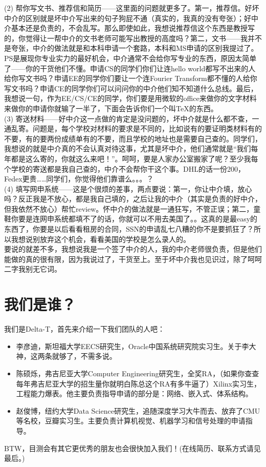 \documentclass{article}
\begin{document}
(2) 帮你写文书、推荐信和简历——这里面的问题就更多了。第一，推荐信。好坏中介的区别就是坏中介写出来的句子狗屁不通（真实的，我真的没有夸张）；好中介基本还是负责的，不会乱写。那么即使如此，我想说推荐信这个东西是教授写的，你觉得让一帮中介的文书老师可能写出教授的高度吗？第二，文书——我并不是夸张，中介的做法就是和本科申请一个套路，本科和MS申请的区别我提过了。PS是展现你专业实力的最好机会，中介通常不会给你写专业的东西，原因太简单了——你的干货他们不懂。申请CS的同学们你们让连hello world都写不出来的人给你写文书吗？申请EE的同学你们要让一个连Fourier Transform都不懂的人给你写文书吗？申请CE的同学你们可以问问你的中介他们知不知道什么总线。最后，我想说一句，作为EE/CS/CE的同学，你们要是用微软的office来做你的文字材料来做你的申请你就输了一半了，下面会告诉你们一个叫TeX的东西。\\

(3) 寄送材料——好中介这一点做的肯定是没问题的，坏中介就是什么都不查，一通乱寄。问题是，每个学校对材料的要求是不同的，比如说有的要证明类材料有的不要，有的要两份成绩单有的不要，而且学校的地址也是需要自己查的。同学们，我想说的就是中介真的不会认真对待这事，尤其是坏中介，他们通常就是“我们每年都是这么寄的，你就这么来吧！”。呵呵，要是人家办公室搬家了呢？至少我每个学校的寄送都是我自己查的，中介不会帮你干这个事。DHL的话一份200，Fedex更贵……同学们，你觉得他们靠谱么。。。？\\

(4) 填写网申系统——这是个很烦的差事，两点要说：第一，你让中介填，放心吗？反正我是不放心，都是我自己填的，之后让我的中介（其实是负责的好中介，但我依然不放心）帮忙review。怀中介的做法就是一通狂写，不管正误；第二，童鞋你要是连网申系统都填不了的话，你就可以不用去美国了。。这真的是最easy的东西了，你要是以后看看租房的合同，SSN的申请乱七八糟的你不是要抓狂了？所以我想说别放弃这个机会，看看美国的学校是怎么录人的。\\
 
要说的就差不多，我想说我是一个签了中介的人，我的中介老师很负责，但是他们能做的真的很有限，因为我说过了，干货至上。至于坏中介我也见识过，除了呵呵二字我别无它词。\\

\section{我们是谁？}
我们是Delta-T，首先来介绍一下我们团队的人吧：
\begin{itemize}
\item{李彦迪，斯坦福大学EECS研究生，Oracle中国系统研究院实习生。关于李大神，这两条就够了，不需多说。}
\item{陈硕烁，弗吉尼亚大学Computer Engineering研究生，全奖RA，（如果你查查每年弗吉尼亚大学的招生量你就明白陈总这个RA有多牛逼了）Xilinx实习生，工程能力爆表。他主要负责指导申请的部分是：网络、嵌入式、体系结构。}
\item{赵俊博，纽约大学Data Science研究生，追随深度学习大牛而去、放弃了CMU等名校，豆瓣实习生。主要负责计算机视觉、机器学习和信号处理的申请指导。}
\end{itemize}
BTW，目测会有其它更优秀的朋友也会很快加入我们！(在线简历、联系方式请见最后。)
\end{document}
